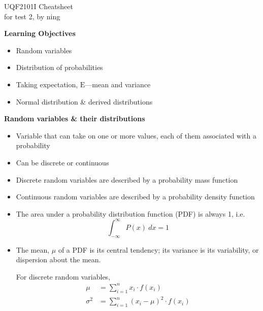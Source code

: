 \documentclass[a4paper]{article}
\newcommand{\heading}[1]{{\small\textbf{#1}}}
\begin{document}
\scriptsize                         %
\setlength\parindent{0pt}           %
\setlength{\abovedisplayskip}{3pt}  %
\setlength{\belowdisplayskip}{3pt}  %

\begin{center}
{\large UQF2101I Cheatsheet}\\{for test 2, by ning}
\end{center}

\begin{multicols*}{4}

\heading{Learning Objectives}
\begin{itemize} \itemsep -0.5em
    \item Random variables
    \item Distribution of probabilities
    \item Taking expectation, $\mathrm{E}$---mean and variance
    \item Normal distribution \& derived distributions
\end{itemize}

\heading{Random variables \& their distributions}
\begin{itemize} \itemsep -0.5em
    \item Variable that can take on one or more values, each of them
        associated with a probability
    \item Can be discrete or continuous
    \item Discrete random variables are described by a probability mass
        function
    \item Continuous random variables are described by a probability
        density function
    \item The area under a probability distribution function (PDF) is 
        always 1, i.e. $$\int^{\infty}_{-\infty} P(x)\ dx = 1$$
    \item The mean, $\mu$ of a PDF is its central tendency; its variance
        is its variability, or dispersion about the mean.

        For discrete random variables,
        \begin{align*}
            \mu &= \sum_{i=1}^n x_i \cdot f(x_i) \\
            \sigma^2 &= \sum_{i=1}^n
                (x_i - \mu)^2 \cdot f(x_i)
        \end{align*}


\end{itemize}
\end{multicols*}
\end{document}
